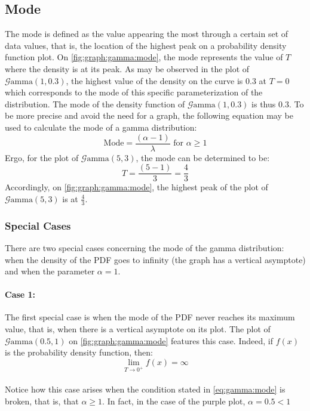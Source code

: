 \documentclass[12pt]{article}
\newcommand{\G}{\mathcal{G}}
\begin{document}
\subsection{Mode}
The mode is defined as the value appearing the most through a certain set of data values, that is, the location of the
highest peak on a probability density function plot. On \autoref{fig:graph:gamma:mode}, the mode represents the value of
$T$ where the density is at its peak.
As may be observed in the plot of $\G\text{amma}(1, 0.3)$, the highest value of the density on the curve is $0.3$ at
$T=0$ which corresponds to the mode of this specific parameterization of the distribution. The mode of the density
function of $\G\text{amma}(1, 0.3)$ is thus $0.3$. To be more precise and avoid the need for a graph, the following
equation may be used to calculate the mode of a gamma distribution:
\begin{equation}\label{eq:gamma:mode}
	\text{Mode} = \frac{(\alpha-1)}{\lambda}\text{ for }\alpha \geq 1
\end{equation}
Ergo, for the plot of $\G\text{amma}(5, 3)$, the mode can be determined to be:
\begin{equation}
	T = \frac{(5-1)}{3} = \frac{4}{3}
\end{equation}
Accordingly, on \autoref{fig:graph:gamma:mode}, the highest peak of the plot of $\G\text{amma}(5, 3)$ is at
$\frac{4}{3}$.

\subsubsection{Special Cases}
There are two special cases concerning the mode of the gamma distribution: when the density of the PDF goes to infinity
(the graph has a vertical asymptote) and when the parameter $\alpha=1$.

\paragraph{Case 1:}
The first special case is when the mode of the PDF never reaches its maximum value, that is, when there is a vertical asymptote
on its plot. The plot of $\G\text{amma}(0.5, 1)$ on \autoref{fig:graph:gamma:mode} features this case. Indeed, if $f(x)$
is the probability density function, then:\vspace*{-20pt}
\begin{equation}
	\lim_{T\to 0^+}f(x)=\infty
\end{equation}\\[-40pt]
Notice how this case arises when the condition stated in \autoref{eq:gamma:mode} is broken, that is, that $\alpha\geq
1$. In fact, in the case of the purple plot, $\alpha=0.5<1$
\end{document}
